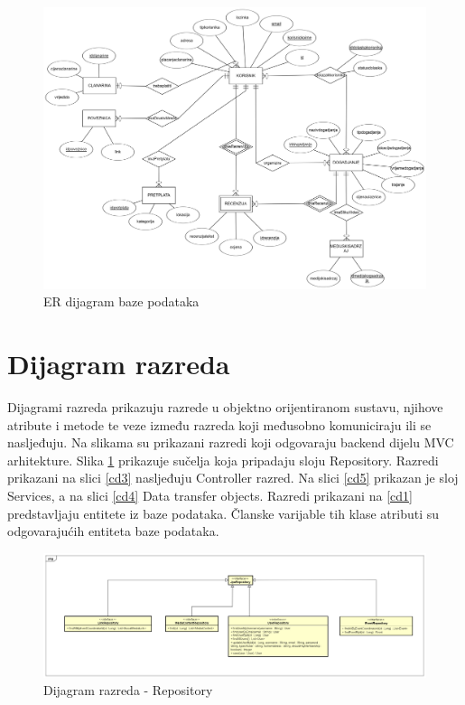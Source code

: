 				\newpage
				
				\begin{figure}[H]
					\includegraphics[width=\textwidth]{dijagrami/db_ER.png} 
					\centering
					\caption{ER dijagram baze podataka}
				\end{figure}
				
			\eject
			
			
		\section{Dijagram razreda}
		
		Dijagrami razreda prikazuju razrede u objektno orijentiranom sustavu, njihove atribute i
		metode te veze između razreda koji međusobno komuniciraju ili se nasljeđuju. Na slikama su prikazani razredi koji odgovaraju backend dijelu MVC arhitekture. Slika \ref{cd2} prikazuje sučelja koja pripadaju sloju Repository. Razredi prikazani na slici \ref{cd3} nasljeđuju Controller razred. Na slici \ref{cd5} prikazan je sloj Services, a na slici \ref{cd4} Data transfer objects. Razredi prikazani na \ref{cd1} predstavljaju entitete iz baze podataka. Članske varijable tih klase atributi su odgovarajućih entiteta baze podataka.

			\begin{figure}[H]
				\includegraphics[width=\textwidth]{dijagrami/cd2.png} 
				\centering
				\caption{Dijagram razreda - Repository}
				\label{cd2}
			\end{figure}
			
